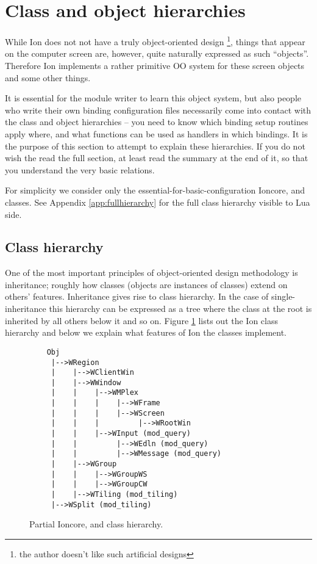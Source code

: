 
\section{Class and object hierarchies}
\label{sec:objects}

While Ion does not not have a truly object-oriented design
\footnote{the author doesn't like such artificial designs},
things that appear on the computer screen are, however, quite
naturally expressed as such ``objects''. Therefore Ion implements
a rather primitive OO system for these screen objects and some
other things. 

It is essential for the module writer to learn this object
system, but also people who write their own binding configuration files
necessarily come into contact with the class and object hierarchies
-- you need to know which binding setup routines apply where, 
and what functions can be used as handlers in which bindings.
It is the purpose of this section to attempt to explain these 
hierarchies. If you do not wish the read the full section, at least
read the summary at the end of it, so that you understand the very
basic relations.

For simplicity we consider only the essential-for-basic-configuration
Ioncore,  and  classes. 
See Appendix \ref{app:fullhierarchy} for the full class hierarchy visible
to Lua side.

\subsection{Class hierarchy}

One of the most important principles of object-oriented design methodology
is inheritance; roughly how classes (objects are instances of classes)
extend on others' features. Inheritance gives rise to class hierarchy.
In the case of single-inheritance this hierarchy can be expressed as a
tree where the class at the root is inherited by all others below it
and so on. Figure \ref{fig:classhierarchy} lists out the Ion class 
hierarchy and below we explain what features of Ion the classes 
implement.

\begin{figure}
\begin{htmlonly}
\docode %
\end{htmlonly}
\begin{verbatim}
    Obj
     |-->WRegion
     |    |-->WClientWin
     |    |-->WWindow
     |    |    |-->WMPlex
     |    |    |    |-->WFrame
     |    |    |    |-->WScreen
     |    |    |         |-->WRootWin
     |    |    |-->WInput (mod_query)
     |    |         |-->WEdln (mod_query)
     |    |         |-->WMessage (mod_query)
     |    |-->WGroup
     |    |    |-->WGroupWS
     |    |    |-->WGroupCW
     |    |-->WTiling (mod_tiling)
     |-->WSplit (mod_tiling)
\end{verbatim}
\caption{Partial Ioncore,  and  
    class hierarchy.}
\label{fig:classhierarchy}
\end{figure}

